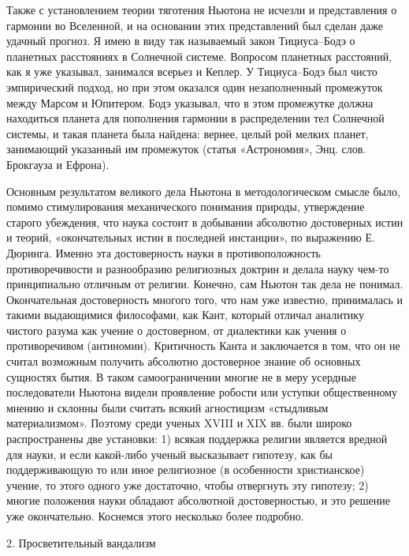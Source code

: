 Также  с   установлением  теории   тяготения  Ньютона  не   исчезли  и
представления   о  гармонии   во  Вселенной,   и  на   основании  этих
представлений  был сделан  даже удачный  прогноз.  Я имею  в виду  так
называемый  закон Тициуса--Бодэ  о планетных  расстояниях в  Солнечной
системе. Вопросом планетных расстояний,  как я уже указывал, занимался
всерьез и  Кеплер. У Тициуса--Бодэ  был чисто эмпирический  подход, но
при  этом  оказался  один  незаполненный  промежуток  между  Марсом  и
Юпитером.  Бодэ  указывал, что  в  этом  промежутке должна  находиться
планета для пополнения гармонии в распределении тел Солнечной системы,
и  такая  планета  была  найдена: вернее,  целый  рой  мелких  планет,
занимающий указанный  им промежуток  (статья «Астрономия»,  Энц. слов.
Брокгауза и Ефрона).

Основным   результатом  великого   дела  Ньютона   в  методологическом
смысле  было, помимо  стимулирования механического  понимания природы,
утверждение старого убеждения, что наука состоит в добывании абсолютно
достоверных  истин   и  теорий,   «окончательных  истин   в  последней
инстанции», по выражению Е. Дюринга.  Именно эта достоверность науки в
противоположность противоречивости и  разнообразию религиозных доктрин
и делала науку чем-то принципиально  отличным от религии. Конечно, сам
Ньютон так дела не  понимал. Окончательная достоверность многого того,
что  нам уже  известно, принималась  и такими  выдающимися философами,
как  Кант,  который отличал  аналитику  чистого  разума как  учение  о
достоверном, от  диалектики как  учения о  противоречивом (антиномии).
Критичность  Канта и  заключается в  том, что  он не  считал возможным
получить абсолютно  достоверное знание об основных  сущностях бытия. В
таком самоограничении многие не  в меру усердные последователи Ньютона
видели проявление  робости или уступки общественному  мнению и склонны
были  считать всякий  агностицизм  «стыдливым материализмом».  Поэтому
среди ученых XVIII и XIX вв. были широко распространены две установки:
1)  всякая  поддержка  религии  является вредной  для  науки,  и  если
какой-либо  ученый  высказывает  гипотезу, как  бы  поддерживающую  то
или  иное религиозное  (в особенности  христианское) учение,  то этого
одного  уже  достаточно,  чтобы  отвергнуть эту  гипотезу;  2)  многие
положения науки обладают абсолютной  достоверностью, и это решение уже
окончательно. Коснемся этого несколько более подробно.

2. Просветительный вандализм

